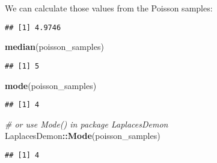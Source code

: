\documentclass[]{article}
\newenvironment{Shaded}{\begin{snugshade}}{\end{snugshade}}
\newcommand{\KeywordTok}[1]{\textcolor[rgb]{0.13,0.29,0.53}{\textbf{#1}}}
\newcommand{\DataTypeTok}[1]{\textcolor[rgb]{0.13,0.29,0.53}{#1}}
\newcommand{\DecValTok}[1]{\textcolor[rgb]{0.00,0.00,0.81}{#1}}
\newcommand{\StringTok}[1]{\textcolor[rgb]{0.31,0.60,0.02}{#1}}
\newcommand{\CommentTok}[1]{\textcolor[rgb]{0.56,0.35,0.01}{\textit{#1}}}
\newcommand{\ControlFlowTok}[1]{\textcolor[rgb]{0.13,0.29,0.53}{\textbf{#1}}}
\newcommand{\OperatorTok}[1]{\textcolor[rgb]{0.81,0.36,0.00}{\textbf{#1}}}
\newcommand{\NormalTok}[1]{#1}
\begin{document}
We can calculate those values from the Poisson samples:

\begin{Shaded}
\end{Shaded}

\begin{verbatim}
## [1] 4.9746
\end{verbatim}

\begin{Shaded}
\begin{Highlighting}[]
\KeywordTok{median}\NormalTok{(poisson_samples)}
\end{Highlighting}
\end{Shaded}

\begin{verbatim}
## [1] 5
\end{verbatim}

\begin{Shaded}
\begin{Highlighting}[]
\KeywordTok{mode}\NormalTok{(poisson_samples)}
\end{Highlighting}
\end{Shaded}

\begin{verbatim}
## [1] 4
\end{verbatim}

\begin{Shaded}
\begin{Highlighting}[]
\CommentTok{# or use Mode() in package LaplacesDemon}
\NormalTok{LaplacesDemon}\OperatorTok{::}\KeywordTok{Mode}\NormalTok{(poisson_samples)}
\end{Highlighting}
\end{Shaded}

\begin{verbatim}
## [1] 4
\end{verbatim}
\end{document}
